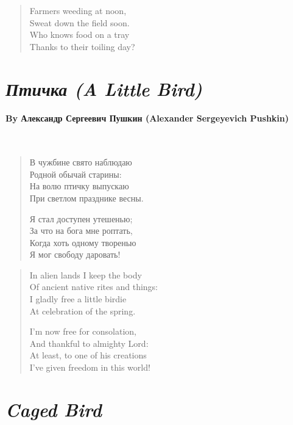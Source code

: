 \vspace{2em}
\begin{verse}
	Farmers weeding at noon,\\
	Sweat down the field soon.\\
	Who knows food on a tray\\
	Thanks to their toiling day?
\end{verse}

\newpage
\section*{\emph{Птичка (A Little Bird)}}
\paragraph{By Александр Сергеевич Пушкин (Alexander Sergeyevich Pushkin)}~

\begin{verse}
	В чужбине свято наблюдаю\\
	Родной обычай старины:\\
	На волю птичку выпускаю\\
	При светлом празднике весны. 
	
	Я стал доступен утешенью;\\
	За что на бога мне роптать,\\
	Когда хоть одному творенью\\
	Я мог свободу даровать! 
\end{verse}

\vspace{2em}
\begin{verse}
	In alien lands I keep the body\\
	Of ancient native rites and things:\\
	I gladly free a little birdie\\
	At celebration of the spring.
	
	
	I'm now free for consolation,\\
	And thankful to almighty Lord:\\
	At least, to one of his creations\\
	I've given freedom in this world!
\end{verse}

\newpage
{}
\section*{\emph{Caged Bird}}

